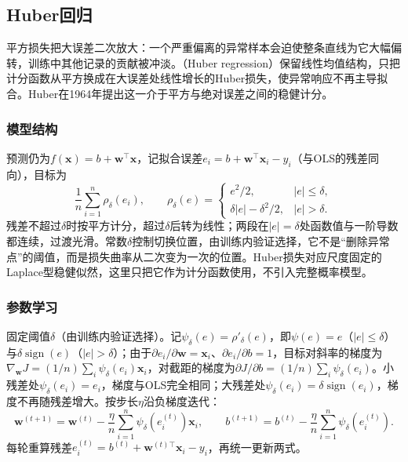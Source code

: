\subsection{Huber回归}
\label{sec:regression-huber}

平方损失把大误差二次放大：一个严重偏离的异常样本会迫使整条直线为它大幅偏转，训练中其他记录的贡献被冲淡。（Huber regression）保留线性均值结构，只把计分函数从平方换成在大误差处线性增长的Huber损失，使异常响应不再主导拟合。Huber在1964年提出这一介于平方与绝对误差之间的稳健计分。

\subsubsection{模型结构}
\label{sec:regression-huber-structure}

预测仍为$f(\bm{x})=b+\bm{w}^{\top}\bm{x}$，记拟合误差$e_i=b+\bm{w}^{\top}\bm{x}_i-y_i$（与OLS的残差同向），目标为
\begin{equation}
  \frac{1}{n}\sum_{i=1}^n\rho_\delta(e_i),
  \qquad
  \rho_\delta(e)=
  \begin{cases}
    e^2/2,&|e|\leq\delta,\\
    \delta|e|-\delta^2/2,&|e|>\delta.
  \end{cases}
  \label{eq:regression-huber-loss}
\end{equation}
残差不超过$\delta$时按平方计分，超过$\delta$后转为线性；两段在$|e|=\delta$处函数值与一阶导数都连续，过渡光滑。常数$\delta$控制切换位置，由训练内验证选择，它不是“删除异常点”的阈值，而是损失曲率从二次变为一次的位置。Huber损失对应尺度固定的Laplace型稳健似然，这里只把它作为计分函数使用，不引入完整概率模型。

\subsubsection{参数学习}
\label{sec:regression-huber-learning}

固定阈值$\delta$（由训练内验证选择）。记$\psi_\delta(e)=\rho'_\delta(e)$，即$\psi(e)=e$（$|e|\leq\delta$）与$\delta\operatorname{sign}(e)$（$|e|>\delta$）；由于$\partial e_i/\partial\bm{w}=\bm{x}_i$、$\partial e_i/\partial b=1$，目标对斜率的梯度为$\nabla_{\bm w}J=(1/n)\sum_i\psi_\delta(e_i)\bm{x}_i$，对截距的梯度为$\partial J/\partial b=(1/n)\sum_i\psi_\delta(e_i)$。小残差处$\psi_\delta(e_i)=e_i$，梯度与OLS完全相同；大残差处$\psi_\delta(e_i)=\delta\operatorname{sign}(e_i)$，梯度不再随残差增大。按步长$\eta$沿负梯度迭代：
\[
  \bm{w}^{(t+1)}
  =\bm{w}^{(t)}-\frac{\eta}{n}\sum_{i=1}^{n}\psi_\delta(e_i^{(t)})\bm{x}_i,
  \qquad
  b^{(t+1)}
  =b^{(t)}-\frac{\eta}{n}\sum_{i=1}^{n}\psi_\delta(e_i^{(t)}).
\]
每轮重算残差$e_i^{(t)}=b^{(t)}+\bm{w}^{(t)\top}\bm{x}_i-y_i$，再统一更新两式。

